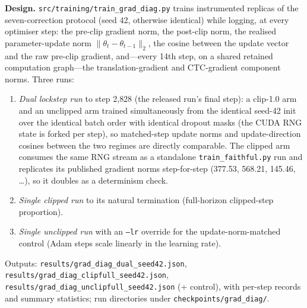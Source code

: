 \documentclass[pdflatex,sn-chicago]{sn-jnl}
\begin{document}
\textbf{Design.} \texttt{src/training/train\_grad\_diag.py} trains instrumented replicas of the seven-correction protocol (seed 42, otherwise identical) while logging, at every optimiser step: the pre-clip gradient norm, the post-clip norm, the realised parameter-update norm $\lVert\theta_t-\theta_{t-1}\rVert_2$, the cosine between the update vector and the raw pre-clip gradient, and---every 14th step, on a shared retained computation graph---the translation-gradient and CTC-gradient component norms. Three runs:
\begin{enumerate}\itemsep0pt
\item \emph{Dual lockstep run} to step 2{,}828 (the released run's final step): a clip-1.0 arm and an unclipped arm trained simultaneously from the identical seed-42 init over the identical batch order with identical dropout masks (the CUDA RNG state is forked per step), so matched-step update norms and update-direction cosines between the two regimes are directly comparable. The clipped arm consumes the same RNG stream as a standalone \texttt{train\_faithful.py} run and replicates its published gradient norms step-for-step (377.53, 568.21, 145.46, \ldots), so it doubles as a determinism check.
\item \emph{Single clipped run} to its natural termination (full-horizon clipped-step proportion).
\item \emph{Single unclipped run} with an \texttt{--lr} override for the update-norm-matched control (Adam steps scale linearly in the learning rate).
\end{enumerate}
Outputs: \texttt{results/grad\_diag\_dual\_seed42.json}, \texttt{results/grad\_diag\_clipfull\_seed42.json}, \texttt{results/grad\_diag\_unclipfull\_seed42.json} (+ control), with per-step records and summary statistics; run directories under \texttt{checkpoints/grad\_diag/}.
\end{document}
